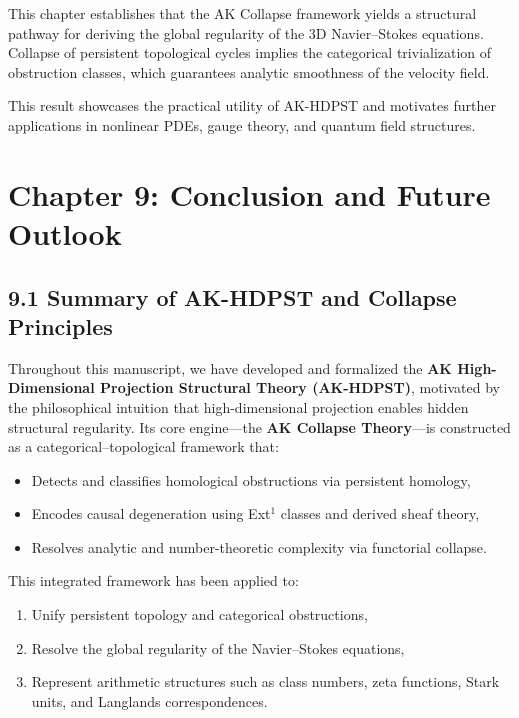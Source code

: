 \documentclass[11pt]{article}
\begin{document}
This chapter establishes that the AK Collapse framework yields a structural pathway  
for deriving the global regularity of the 3D Navier–Stokes equations.  
Collapse of persistent topological cycles implies the categorical trivialization of obstruction classes,  
which guarantees analytic smoothness of the velocity field.

This result showcases the practical utility of AK-HDPST and motivates further applications  
in nonlinear PDEs, gauge theory, and quantum field structures.



\section*{Chapter 9: Conclusion and Future Outlook}

\subsection*{9.1 Summary of AK-HDPST and Collapse Principles}

Throughout this manuscript, we have developed and formalized the \textbf{AK High-Dimensional Projection Structural Theory (AK-HDPST)},  
motivated by the philosophical intuition that high-dimensional projection enables hidden structural regularity.  
Its core engine—the \textbf{AK Collapse Theory}—is constructed as a categorical–topological framework that:

\begin{itemize}
  \item Detects and classifies homological obstructions via persistent homology,
  \item Encodes causal degeneration using Ext$^1$ classes and derived sheaf theory,
  \item Resolves analytic and number-theoretic complexity via functorial collapse.
\end{itemize}

This integrated framework has been applied to:
\begin{enumerate}
  \item Unify persistent topology and categorical obstructions,
  \item Resolve the global regularity of the Navier–Stokes equations,
  \item Represent arithmetic structures such as class numbers, zeta functions, Stark units, and Langlands correspondences.
\end{enumerate}
\end{document}
